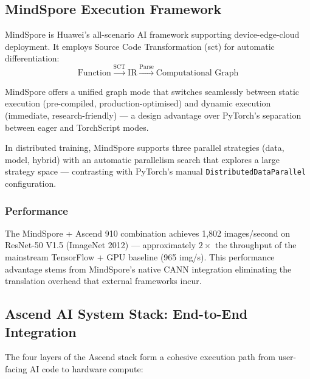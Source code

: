 \subsection{MindSpore Execution Framework}
\label{subsec:mindspore}

MindSpore is Huawei's all-scenario AI framework supporting device-edge-cloud
deployment. It employs Source Code Transformation (\acrshort{sct}) for
automatic differentiation:
\begin{equation}
  \text{Function} \xrightarrow{\text{SCT}} \text{IR}
  \xrightarrow{\text{Parse}} \text{Computational Graph}
  \label{eq:sct}
\end{equation}

MindSpore offers a unified graph mode that switches seamlessly between
static execution (pre-compiled, production-optimised) and dynamic execution
(immediate, research-friendly) — a design advantage over PyTorch's separation
between eager and TorchScript modes.

In distributed training, MindSpore supports three parallel strategies
(data, model, hybrid) with an automatic parallelism search that explores
a large strategy space — contrasting with PyTorch's manual
\texttt{DistributedDataParallel} configuration.

\subsubsection{Performance}

The MindSpore + Ascend 910 combination achieves 1,802 images/second on
ResNet-50 V1.5 (ImageNet 2012) — approximately $2\times$ the throughput
of the mainstream TensorFlow + GPU baseline (965 img/s). This performance
advantage stems from MindSpore's native CANN integration eliminating the
translation overhead that external frameworks incur.


\subsection{Ascend AI System Stack: End-to-End Integration}
\label{subsec:ascend-stack}

The four layers of the Ascend stack form a cohesive execution path from
user-facing AI code to hardware compute:

